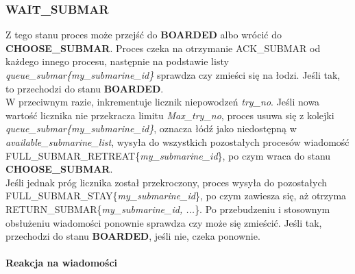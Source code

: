 \documentclass[a4paper]{article}
\begin{document}
\subsubsection{\textbf{WAIT\_SUBMAR}}
Z tego stanu proces może przejść do \textbf{BOARDED} albo wrócić do \textbf{CHOOSE\_SUBMAR}.
Proces czeka na otrzymanie ACK\_SUBMAR od każdego innego procesu, następnie na podstawie listy \textit{queue\_submar\{my\_submarine\_id\}} sprawdza czy zmieści się na łodzi.
Jeśli tak, to przechodzi do stanu \textbf{BOARDED}.\\
W przeciwnym razie, inkrementuje licznik niepowodzeń \textit{try\_no}. Jeśli nowa wartość licznika nie przekracza limitu \textit{Max\_try\_no}, proces usuwa się z kolejki \textit{queue\_submar\{my\_submarine\_id\}}, 
oznacza łódź jako niedostępną w \textit{available\_submarine\_list}, wysyła do wszystkich pozostałych procesów wiadomość FULL\_SUBMAR\_RETREAT\{\textit{my\_submarine\_id}\}, po czym wraca
do stanu \textbf{CHOOSE\_SUBMAR}.\\
Jeśli jednak próg licznika został przekroczony, proces wysyła do pozostałych
\\FULL\_SUBMAR\_STAY\{\textit{my\_submarine\_id}\}, po czym zawiesza się, aż otrzyma
\\RETURN\_SUBMAR\{\textit{my\_submarine\_id, ...}\}. Po przebudzeniu i stosownym obsłużeniu wiadomości ponownie sprawdza czy może się zmieścić. Jeśli tak, przechodzi do stanu \textbf{BOARDED}, jeśli nie, czeka ponownie.
\\
\\
\textbf{Reakcja na wiadomości}
\end{document}
